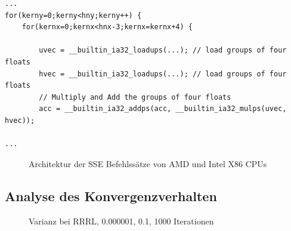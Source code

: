 \documentclass[a4paper,12pt]{article}
\begin{document}
\begin{lstlisting}[float,caption={verwendete x86 build-in
SSE Erweiterungen},label=lst:listData]
...
for(kerny=0;kerny<hny;kerny++) {
	for(kernx=0;kernx<hnx-3;kernx=kernx+4) {
		
		uvec = __builtin_ia32_loadups(...); // load groups of four floats
		hvec = __builtin_ia32_loadups(...); // load groups of four floats
		// Multiply and Add the groups of four floats
		acc = __builtin_ia32_addps(acc, __builtin_ia32_mulps(uvec, hvec));
 
...
\end{lstlisting}
 

\begin{figure}[htbp]
\caption{Architektur der SSE Befehlssätze von AMD und Intel X86 CPUs
\cite{sse_arch}}%
\label{figure_sse_arch}
\end{figure}


\subsection{Analyse des Konvergenzverhalten}\label{chp:methodik_konvergenz} 


\begin{figure}[htbp]
\caption{Varianz bei RRRL, 0.000001, 0.1, 1000 Iterationen}%
\label{figure_konver_altes_bild}
\end{figure}
\end{document}
